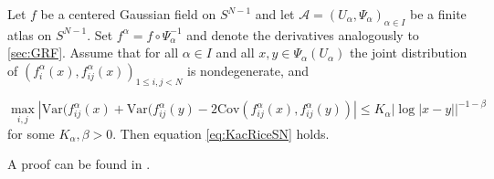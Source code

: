 \begin{theorem}\label{thm:KacRice}
	Let $f$ be a centered Gaussian field on $S^{N-1}$ and let $\mathcal A=(U_\alpha,\Psi_\alpha)_{\alpha\in I}$ be a finite atlas on $S^{N-1}$. Set $f^\alpha = f\circ\Psi^{-1}_\alpha$ and denote the derivatives analogously to \ref{sec:GRF}. Assume that for all $\alpha\in I$ and all $x,y\in \Psi_\alpha(U_\alpha)$ the joint distribution of $(f_i^\alpha(x),f_{ij}^\alpha(x))_{1\leq i,j<N}$ is nondegenerate, and 
	
	$$\max_{i,j}|\text{Var}(f_{ij}^\alpha(x)+\text{Var}(f_{ij}^\alpha(y)-2\text{Cov}(f_{ij}^\alpha(x),f_{ij}^\alpha(y))|\leq K_\alpha|\log|x-y||^{-1-\beta}$$
	for some $K_\alpha,\beta>0$. Then equation \eqref{eq:KacRiceSN} holds.
\end{theorem}

A proof can be found in \cite{Adler07}.








